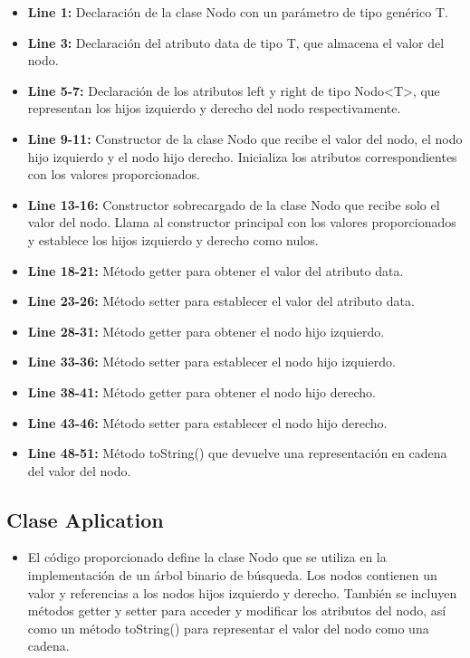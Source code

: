 \documentclass{article}
\begin{document}
\begin{itemize}
	\begin{itemize}
		\item \textbf{Line 1:} Declaración de la clase Nodo con un parámetro de tipo genérico T.
		\item \textbf{Line 3:} Declaración del atributo data de tipo T, que almacena el valor del nodo.
		\item \textbf{Line 5-7:} Declaración de los atributos left y right de tipo Nodo<T>, que representan los hijos izquierdo y derecho del nodo respectivamente.
		\item \textbf{Line 9-11:} Constructor de la clase Nodo que recibe el valor del nodo, el nodo hijo izquierdo y el nodo hijo derecho. Inicializa los atributos correspondientes con los valores proporcionados.
		\item \textbf{Line 13-16:} Constructor sobrecargado de la clase Nodo que recibe solo el valor del nodo. Llama al constructor principal con los valores proporcionados y establece los hijos izquierdo y derecho como nulos.
		\item \textbf{Line 18-21:} Método getter para obtener el valor del atributo data.
		\item \textbf{Line 23-26:} Método setter para establecer el valor del atributo data.
		\item \textbf{Line 28-31:} Método getter para obtener el nodo hijo izquierdo.
		\item \textbf{Line 33-36:} Método setter para establecer el nodo hijo izquierdo.
		\item \textbf{Line 38-41:} Método getter para obtener el nodo hijo derecho.
		\item \textbf{Line 43-46:} Método setter para establecer el nodo hijo derecho.
		\item \textbf{Line 48-51:} Método toString() que devuelve una representación en cadena del valor del nodo.
	\end{itemize}
\subsection{Clase Aplication}
\begin{itemize}	
	\item  El código proporcionado define la clase Nodo que se utiliza en la implementación de un árbol binario de búsqueda. Los nodos contienen un valor y referencias a los nodos hijos izquierdo y derecho. También se incluyen métodos getter y setter para acceder y modificar los atributos del nodo, así como un método toString() para representar el valor del nodo como una cadena.


\end{itemize}
\end{itemize}
\end{document}
